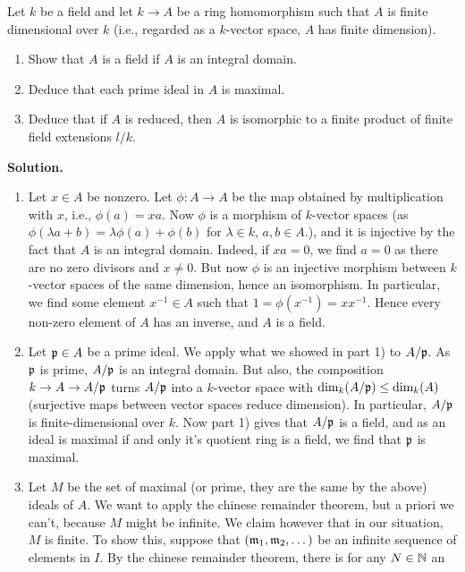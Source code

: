 \documentclass[a4paper,11pt]{article}
\begin{document}
Let $k$ be a field and let $k \to A$ be a ring homomorphism such that 
$A$ is finite dimensional over $k$ (i.e., regarded as a $k$-vector space,
$A$ has finite dimension).
\begin{enumerate}
    \item Show that $A$ is a field if $A$ is an integral domain.
    \item Deduce that each prime ideal in $A$ is maximal.
    \item Deduce that if $A$ is reduced, then $A$ is isomorphic to a finite 
        product of finite field extensions $l/k$. 
\end{enumerate}
\textbf{Solution.}
\begin{enumerate}
    \item Let $x \in A$ be nonzero. Let $\phi: A \to A$ be the map obtained by 
        multiplication with $x$, i.e., $\phi(a) = x a$. Now $\phi$ is a morphism
        of $k$-vector spaces (as $\phi(\lambda a + b) = \lambda \phi(a) + \phi(b)$
        for $\lambda \in k$, $a,b \in A$.), and it is injective by the fact that 
        $A$ is an integral domain. Indeed, if $xa = 0$, we find $a = 0$ as there
        are no zero divisors and $x \neq 0$. But now $\phi$ is an injective morphism
        between $k$-vector spaces of the same dimension, hence an isomorphism.
        In particular, we find some element $x^{-1} \in A$ such that 
        $1 = \phi(x^{-1}) = x x^{-1}$. Hence every non-zero element of $A$ has an
        inverse, and $A$ is a field.
    \item Let $\mathfrak{p} \in A$ be a prime ideal. We apply what we showed in part 1)
        to $A/\mathfrak{p}$. As $\mathfrak{p}$ is prime, $A/\mathfrak{p}$ is an integral domain. But also,
        the composition $k \to A \to A/ \mathfrak{p}$ turns $A/\mathfrak{p}$ into a $k$-vector space
        with $\dim_k(A/\mathfrak{p}) \leq \dim_k(A)$ (surjective maps between vector spaces
        reduce dimension). In particular, $A/\mathfrak{p}$ is finite-dimensional over
        $k$. Now part 1) gives that $A/\mathfrak{p}$ is a field, and as an ideal is 
        maximal if and only it's quotient ring is a field, we find that 
        $\mathfrak{p}$ is maximal. 
    \item Let $M$ be the set of maximal (or prime, they are the same by the
        above) ideals of $A$. We want to apply the chinese remainder theorem,
        but a priori we can't, because $M$ might be infinite. We claim however
        that in our situation, $M$ is finite. To show this, suppose
        that $(\mathfrak{m}_1, \mathfrak{m}_2, \dots)$ be an infinite sequence of elements in
        $I$. By the chinese remainder theorem, there is for any $N \in \mathbb{N}$ an

\end{enumerate}
\end{document}
